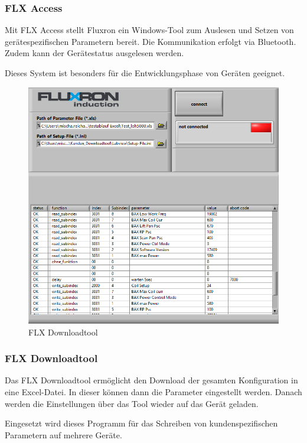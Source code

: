 \subsubsection{FLX Access}
\label{subsubsec:FLX Access}

Mit FLX Access stellt Fluxron ein Windows-Tool zum Auslesen und Setzen von gerätespezifischen Parametern bereit. Die Kommunikation erfolgt via Bluetooth. Zudem kann der Gerätestatus ausgelesen werden. 

Dieses System ist besonders für die Entwicklungsphase von Geräten geeignet.

\vspace{2cm}
\WFclear
\begin{figure}
	\includegraphics[scale=0.25]{analysis/res/flxdltool}
	\caption{FLX Downloadtool}
\end{figure}

\subsubsection{FLX Downloadtool}
\label{subsubsec:FLX Downloadtool}

Das FLX Downloadtool ermöglicht den Download der gesamten Konfiguration in eine Excel-Datei. In dieser können dann die Parameter eingestellt werden. Danach werden die Einstellungen über das Tool wieder auf das Gerät geladen.

Eingesetzt wird dieses Programm für das Schreiben von kundenspezifischen Parametern auf mehrere Geräte.
\WFclear